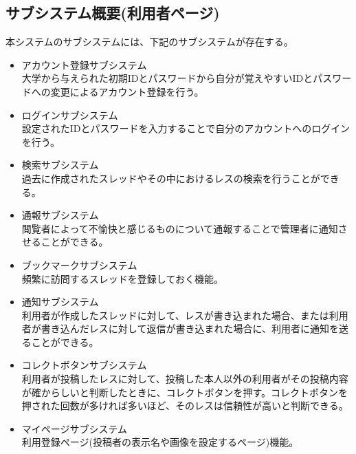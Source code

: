 \documentclass[a4j]{jarticle}
\begin{document}
\subsection{サブシステム概要(利用者ページ)}
本システムのサブシステムには、下記のサブシステムが存在する。
\begin{itemize}
\item アカウント登録サブシステム\\
大学から与えられた初期IDとパスワードから自分が覚えやすいIDとパスワードへの変更によるアカウント登録を行う。

\item ログインサブシステム\\
設定されたIDとパスワードを入力することで自分のアカウントへのログインを行う。

\item 検索サブシステム\\
過去に作成されたスレッドやその中におけるレスの検索を行うことができる。

\item 通報サブシステム\\
閲覧者によって不愉快と感じるものについて通報することで管理者に通知させることができる。

\item ブックマークサブシステム\\
頻繁に訪問するスレッドを登録しておく機能。

\item 通知サブシステム\\
利用者が作成したスレッドに対して、レスが書き込まれた場合、または利用者が書き込んだレスに対して返信が書き込まれた場合に、利用者に通知を送ることができる。

\item コレクトボタンサブシステム\\
利用者が投稿したレスに対して、投稿した本人以外の利用者がその投稿内容が確からしいと判断したときに、コレクトボタンを押す。コレクトボタンを押された回数が多ければ多いほど、そのレスは信頼性が高いと判断できる。

\item マイページサブシステム\\
利用登録ページ(投稿者の表示名や画像を設定するページ)機能。
\end{itemize}
\end{document}
